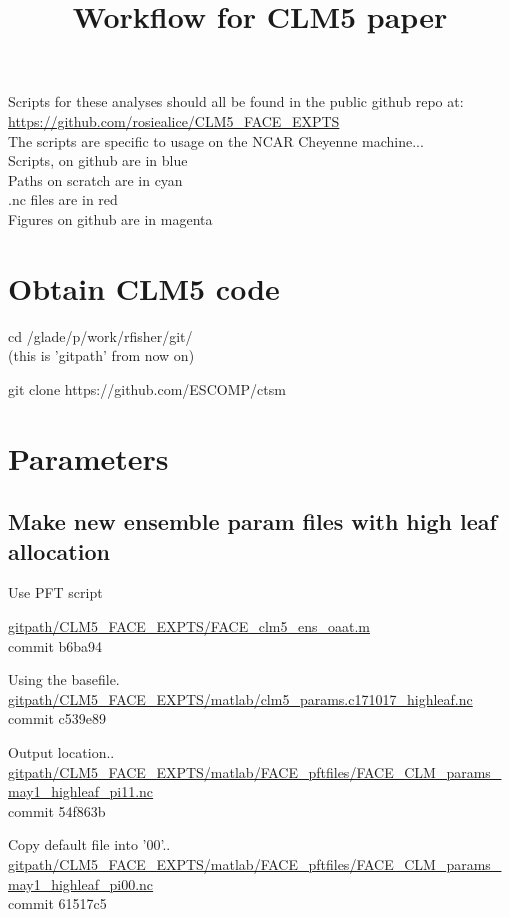 \documentclass{article}
\begin{document}
\title{Workflow for CLM5 paper}


Scripts for these analyses should all be found in the public github repo at:\\
{\color{blue}\small{\url{https://github.com/rosiealice/CLM5_FACE_EXPTS}}}\\

The scripts are specific to usage on the NCAR Cheyenne machine...\\

{\color{blue} Scripts, on github are in blue}\\
{\color{cyan} Paths on scratch are in cyan}\\
{\color{red}  .nc files are in red}\\
{\color{magenta} Figures on github are in magenta}\\

\section{Obtain CLM5 code}
cd /glade/p/work/rfisher/git/\\
(this is 'gitpath' from now on)

git clone https://github.com/ESCOMP/ctsm 
\section{Parameters}


\subsection{Make new ensemble param files with high leaf allocation }

Use PFT script

{\color{blue}\small{\url{gitpath/CLM5_FACE_EXPTS/FACE_clm5_ens_oaat.m}}}\\ 
commit b6ba94

Using the basefile. \\
{\color{red}\small{\url{gitpath/CLM5_FACE_EXPTS/matlab/clm5_params.c171017_highleaf.nc}}} \\
commit c539e89


Output location..\\
{\color{red}\small{\url{gitpath/CLM5_FACE_EXPTS/matlab/FACE_pftfiles/FACE_CLM_params_may1_highleaf_pi11.nc }}} \\
commit 54f863b

Copy default file into '00'..\\
{\color{red}\small{\url{gitpath/CLM5_FACE_EXPTS/matlab/FACE_pftfiles/FACE_CLM_params_may1_highleaf_pi00.nc }}} \\
commit 61517c5 
\end{document}
